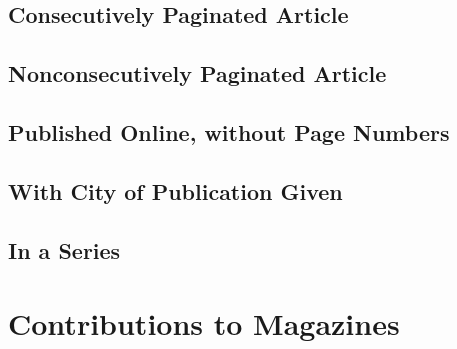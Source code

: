 \documentclass{article}
\begin{document}
\subsection{Consecutively Paginated Article} %
\label{sub:consecutively_paginated_article}
\begin{refsection}
	\nocite{Sharpe:wa}
	\printbibliography[heading=none]
\end{refsection}
\subsection{Nonconsecutively Paginated Article} %
\label{sub:nonconsecutively_paginated_article}
\begin{refsection}
	\nocite{Haughney:ty}
	\printbibliography[heading=none]
\end{refsection}
\subsection{Published Online, without Page Numbers} %
\label{sub:published_online_without_page_numbers}
\begin{refsection}
	\nocite{Parker-Pope:wm,Tribble:tc}
	\printbibliography[heading=none]
\end{refsection}
\subsection{With City of Publication Given} %
\label{sub:with_city_of_publication_given}
\begin{refsection}
	\nocite{Alaton:tc}
	\printbibliography[heading=none]
\end{refsection}
\subsection{In a Series} %
\label{sub:in_a_series}
\begin{refsection}
	\nocite{Glatter:wx}
	\printbibliography[heading=none]
\end{refsection}

\section{Contributions to Magazines} %
\label{sec:contributions_to_magazines}
\end{document}
